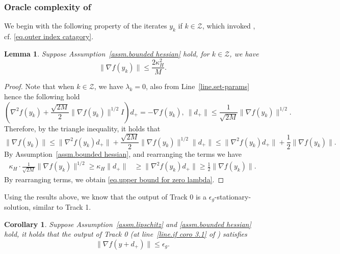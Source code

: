 \documentclass{article}
\newtheorem{lemma}[theorem]{Lemma}
\newtheorem{corollary}[theorem]{Corollary}
\numberwithin{equation}{section}
\numberwithin{equation}{section}
\begin{document}
\subsubsection{Oracle complexity of }\label{sec.oracle compl}
We begin with the following property of the iterates $y_k$ if $k\in\mathcal{Z}$, which invoked , cf. \eqref{eq.outer index catagory}.
\begin{lemma}
    \label{lem.upper bound for zero lambda}
    Suppose Assumption~\ref{assm.bounded hessian} hold, for $k\in \mathcal{Z}$, we have
    \begin{equation}
        \label{eq.upper bound for zero lambda}
        \|\nabla f(y_k)\|\leq \frac{2\kappa_H^2}{M}.
    \end{equation}
\end{lemma}
\begin{proof}
    Note that when $k\in \mathcal{Z}$, we have $\lambda_k =0$, also from Line~\ref{line.set-params} hence the following hold
    \begin{equation*}
        \left (\nabla^2 f(y_k)+\frac{\sqrt{2M}}{2}\|\nabla f(y_k)\|^{1/2} I\right )d_+ = -\nabla f(y_k), \ \|d_+\| \leq \frac{1}{\sqrt{2M}}\|\nabla f(y_k)\|^{1/2}.
    \end{equation*}
    Therefore, by the triangle inequality, it holds that
    \begin{equation*}
        \|\nabla f(y_k)\| \leq \|\nabla^2 f(y_k) d_+\| +\frac{\sqrt{2M}}{2}\|\nabla f(y_k)\|^{1/2}\|d_+\| \leq \|\nabla^2 f(y_k) d_+\|+\frac{1}{2}\|\nabla f(y_k)\|.
    \end{equation*}
    By Assumption~\ref{assm.bounded hessian}, and rearranging the terms we have
    \begin{equation*}
        \begin{aligned}
            \kappa_H \cdot \frac{1}{\sqrt{2M}}\|\nabla f(y_k)\|^{1/2}  \geq \kappa_H \|d_+\| & \geq \|\nabla^2 f(y_k) d_+\|       \geq \frac{1}{2}\|\nabla f(y_k)\|.
        \end{aligned}
    \end{equation*}
    By rearranging terms, we obtain \eqref{eq.upper bound for zero lambda}.
\end{proof}
Using the results above, we know that the output of {Track 0} is a $\epsilon_g$-stationary-solution, similar to Track 1.
\begin{corollary}
    \label{coro.second et}
    Suppose Assumption~\ref{assm.lipschitz} and \ref{assm.bounded hessian} hold,
    it holds that the output of {Track 0} (at line~\ref{line.if coro 3.1} of ) satisfies
    \begin{equation*}
        \|\nabla f(y+d_+)\|\leq \epsilon_g.
    \end{equation*}
\end{corollary}
\end{document}
